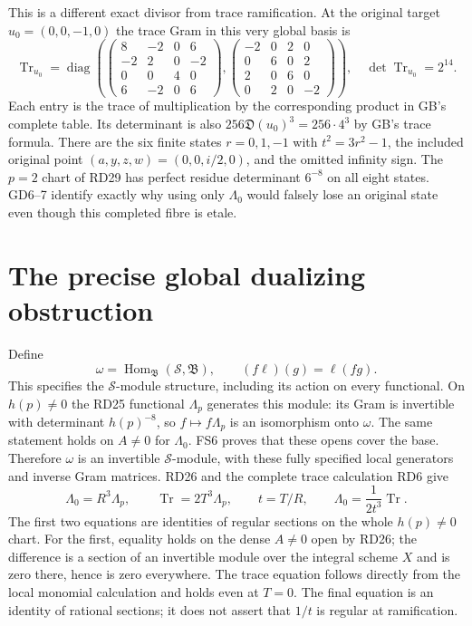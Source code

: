 This is a different exact divisor from trace ramification.
At the original target $u_0=(0,0,-1,0)$ the trace Gram in
this very global basis is
\begin{equation}
 \operatorname{Tr}_{u_0}=\operatorname{diag}\left(
 \begin{pmatrix}8&-2&0&6\\-2&2&0&-2\\0&0&4&0\\6&-2&0&6\end{pmatrix},
 \begin{pmatrix}-2&0&2&0\\0&6&0&2\\2&0&6&0\\0&2&0&-2\end{pmatrix}\right),
 \quad\det\operatorname{Tr}_{u_0}=2^{14}.
 \tag{GD7}
\end{equation}
Each entry is the trace of multiplication by the corresponding
product in GB's complete table. Its determinant is also
$256\mathfrak D(u_0)^3=256\cdot4^3$ by GB's trace formula.
There are the six finite states $r=0,1,-1$ with
$t^2=3r^2-1$, the included original point
$(a,y,z,w)=(0,0,i/2,0)$, and the omitted infinity sign.
The $p=2$ chart of RD29 has perfect residue determinant
$6^{-8}$ on all eight states. GD6--7 identify exactly why
using only $\Lambda_0$ would falsely lose an original state
even though this completed fibre is etale.

\section{The precise global dualizing obstruction}
Define
\begin{equation}
 \omega=\operatorname{Hom}_{\mathfrak B}(\mathscr S,\mathfrak B),
 \qquad (f\ell)(g)=\ell(fg).
 \tag{GD8}
\end{equation}
This specifies the $\mathscr S$-module structure, including
its action on every functional. On $h(p)\ne0$ the RD25
functional $\Lambda_p$ generates this module: its Gram is
invertible with determinant $h(p)^{-8}$, so
$f\mapsto f\Lambda_p$ is an isomorphism onto $\omega$.
The same statement holds on $A\ne0$ for $\Lambda_0$.
FS6 proves that these opens cover the base. Therefore
$\omega$ is an invertible $\mathscr S$-module, with these
fully specified local generators and inverse Gram matrices.
RD26 and the complete trace calculation RD6 give
\begin{equation}
 \Lambda_0=R^3\Lambda_p,\qquad
 \operatorname{Tr}=2T^3\Lambda_p,\qquad
 t=T/R,\qquad
 \Lambda_0=\frac{1}{2t^3}\operatorname{Tr}.
 \tag{GD9}
\end{equation}
The first two equations are identities of regular sections
on the whole $h(p)\ne0$ chart. For the first, equality
holds on the dense $A\ne0$ open by RD26; the difference
is a section of an invertible module over the integral
scheme $X$ and is zero there, hence is zero everywhere.
The trace equation follows directly from the local
monomial calculation and holds even at $T=0$.
The final equation is an identity of rational sections;
it does not assert that $1/t$ is regular at ramification.

